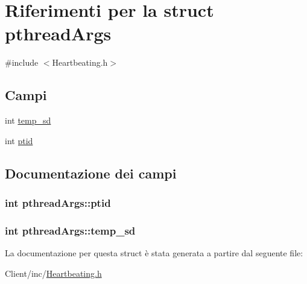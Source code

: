 \hypertarget{structpthreadArgs}{\section{Riferimenti per la struct pthread\+Args}
\label{structpthreadArgs}
}


{\ttfamily \#include $<$Heartbeating.\+h$>$}

\subsection*{Campi}
\begin{DoxyCompactItemize}
\item 
int \hyperlink{structpthreadArgs_a028f49dcb3a6ed77870caacec6f2b968}{temp\+\_\+sd}
\item 
int \hyperlink{structpthreadArgs_abc763a99a614f8e00c11fbbece336516}{ptid}
\end{DoxyCompactItemize}


\subsection{Documentazione dei campi}
\hypertarget{structpthreadArgs_abc763a99a614f8e00c11fbbece336516}{
\subsubsection[{ptid}]{\setlength{\rightskip}{0pt plus 5cm}int pthread\+Args\+::ptid}}\label{structpthreadArgs_abc763a99a614f8e00c11fbbece336516}
\hypertarget{structpthreadArgs_a028f49dcb3a6ed77870caacec6f2b968}{
\subsubsection[{temp\+\_\+sd}]{\setlength{\rightskip}{0pt plus 5cm}int pthread\+Args\+::temp\+\_\+sd}}\label{structpthreadArgs_a028f49dcb3a6ed77870caacec6f2b968}


La documentazione per questa struct è stata generata a partire dal seguente file\+:\begin{DoxyCompactItemize}
\item 
Client/inc/\hyperlink{Client_2inc_2Heartbeating_8h}{Heartbeating.\+h}\end{DoxyCompactItemize}
